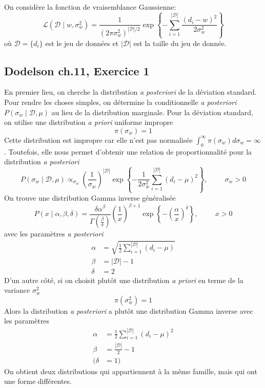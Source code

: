 \documentclass{article}
\numberwithin{equation}{section}
\begin{document}
On considère la fonction de vraisemblance Gaussienne:
\[
        \mathcal{L}(\mathcal{D} \mid w, \sigma_w^2) 
        = \frac{1}{(2 \pi \sigma_w^2)^{|\mathcal{D}|/2}}
        \exp \left\{ -\sum_{i=1}^{|\mathcal{D}|}\frac{(d_i - w)^{2} }{2 \sigma_w^2} \right\}
\]
où $\mathcal{D} = \{d_i \}$ est le jeu de données et $|\mathcal{D}|$ est 
la taille du jeu de donnée.

\subsection{Dodelson ch.11, Exercice 1}
En premier lieu, on cherche la distribution \textit{a posteriori} de 
la déviation standard. Pour rendre les choses simples, on détermine 
la conditionnelle \textit{a posteriori} $P(\sigma_w \mid \mathcal{D}, \mu)$ 
au lieu de la distribution marginale. Pour la déviation standard, on 
utilise une distribution \textit{a priori} uniforme impropre
\[
        \pi(\sigma_w) = 1
\]
Cette distribution est impropre car elle n'est pas normalisée 
$\int_{0}^{\infty }\pi(\sigma_w) d\sigma_w = \infty $
. Toutefois, 
elle nous permet d'obtenir une relation de proportionnalité pour 
la distribution \textit{a posteriori} 
\[
        P(\sigma_w \mid \mathcal{D}, \mu) \propto_{\sigma_w}
        \left(\frac{1}{\sigma_w}  \right)^{|\mathcal{D}|} 
        \exp
        \left\{ -\frac{1}{2\sigma_w^2}\sum_{i=1}^{|\mathcal{D}|}
        (d_i - \mu)^{2}\right\}, \hspace{1cm} \sigma_w > 0
\]
On trouve une distribution Gamma inverse généralisée
\[
        P(x \mid \alpha, \beta, \delta ) = 
        \frac{\delta \alpha^{\beta}}{\Gamma(\frac{\beta}{\delta })} 
        \left(\frac{1}{x}\right)^{\beta + 1}
        \exp \left\{ - \left(\frac{\alpha}{x}\right)^{\delta } \right\}, \hspace{1cm} x > 0
\]
avec les paramètres \textit{a posteriori}
\begin{align*}
        \alpha &= \sqrt{\frac{1}{2}\sum_{i=1}^{|\mathcal{D}|}(d_i - \mu)} \\
        \beta &= |\mathcal{D}| - 1 \\
        \delta &= 2
\end{align*}
D'un autre côté, si on choisit plutôt une distribution \textit{a priori} en terme 
de la variance $\sigma_w^2$
\[
        \pi(\sigma_w^2) = 1
\]
Alors la distribution \textit{a posteriori} a plutôt une distribution Gamma inverse avec 
les paramètres
\begin{align*}
        \alpha &=  \frac{1}{2}\sum_{i = 1}^{|\mathcal{D}|} (d_i - \mu)^{2} \\
        \beta &= \frac{|\mathcal{D}|}{2} - 1 \\
        (\delta &=  1)
\end{align*}
On obtient deux distributions qui appartiennent à la même famille, mais qui ont une 
forme différentes.
\end{document}
